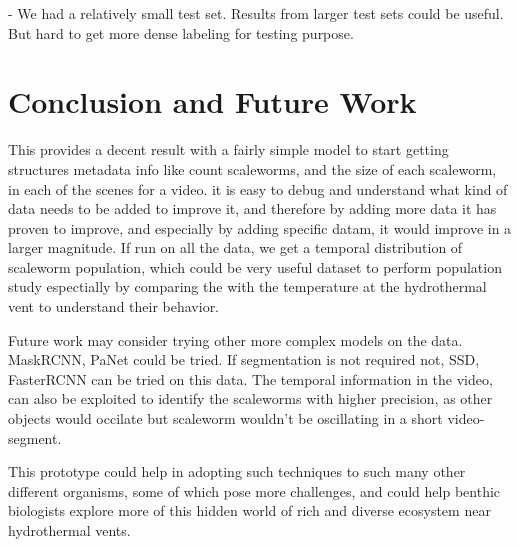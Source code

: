\documentclass[10pt,twocolumn,letterpaper]{article}
\begin{document}
- We had a relatively small test set. Results from larger test sets could be useful. But hard to get more dense labeling for testing purpose.

\section{Conclusion and Future Work}

This provides a decent result with a fairly simple model to start getting structures metadata info like count scaleworms, and the size of each scaleworm, in each of the scenes for a video. it is easy to debug and understand what kind of data needs to be added to improve it, and therefore by adding more data it has proven to improve, and especially by adding specific datam, it would improve in a larger magnitude. If run on all the data, we get a temporal distribution of scaleworm population, which could be very useful dataset to perform population study espectially by comparing the with the temperature at the hydrothermal vent to understand their behavior.

Future work may consider trying other more complex models on the data. MaskRCNN, PaNet could be tried. If segmentation is not required not, SSD, FasterRCNN can be tried on this data. The temporal information in the video, can also be exploited to identify the scaleworms with higher precision, as other objects would occilate but scaleworm wouldn't be oscillating in a short video-segment.

This prototype could help in adopting such techniques to such many other different organisms, some of which pose more challenges, and could help benthic biologists explore more of this hidden world of rich and diverse ecosystem near hydrothermal vents.


{\small


}
\end{document}
